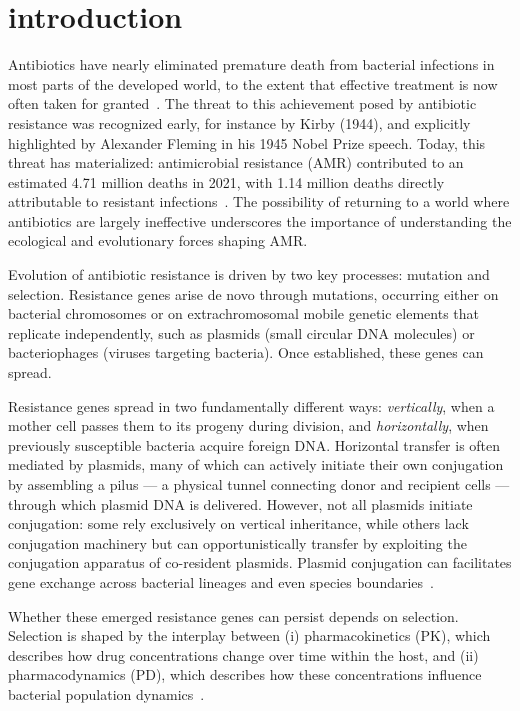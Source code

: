 \documentclass[../main.tex]{subfiles}
\begin{document}
\chapter{introduction}
Antibiotics have nearly eliminated premature death from bacterial infections in most parts of the developed world, to the extent that effective treatment is now often taken for granted~\cite{Hawkey2008}.
The threat to this achievement posed by antibiotic resistance was recognized early, for instance by Kirby (1944), and explicitly highlighted by Alexander Fleming in his 1945 Nobel Prize speech.
Today, this threat has materialized: antimicrobial resistance (AMR) contributed to an estimated 4.71 million deaths in 2021, with 1.14 million deaths directly attributable to resistant infections~\cite{Naghavi2024}.
The possibility of returning to a world where antibiotics are largely ineffective underscores the importance of understanding the ecological and evolutionary forces shaping AMR.

Evolution of antibiotic resistance is driven by two key processes: mutation and selection. Resistance genes arise de novo through mutations, occurring either on bacterial chromosomes or on extrachromosomal mobile genetic elements that replicate independently, such as plasmids (small circular DNA molecules) or bacteriophages (viruses targeting bacteria). Once established, these genes can spread.

Resistance genes spread in two fundamentally different ways: \emph{vertically}, when a mother cell passes them to its progeny during division, and \emph{horizontally}, when previously susceptible bacteria acquire foreign DNA.
Horizontal transfer is often mediated by plasmids, many of which can actively initiate their own conjugation by assembling a pilus --- a physical tunnel connecting donor and recipient cells --- through which plasmid DNA is delivered.
However, not all plasmids initiate conjugation: some rely exclusively on vertical inheritance, while others lack conjugation machinery but can opportunistically transfer by exploiting the conjugation apparatus of co-resident plasmids.
Plasmid conjugation can facilitates gene exchange across bacterial lineages and even species boundaries~\cite{Frost2005, Smillie2010}.

Whether these emerged resistance genes can persist depends on selection.
Selection is shaped by the interplay between (i) pharmacokinetics (PK), which describes how drug concentrations change over time within the host, and (ii) pharmacodynamics (PD), which describes how these concentrations influence bacterial population dynamics~\cite{Regoes2004}.
\end{document}
